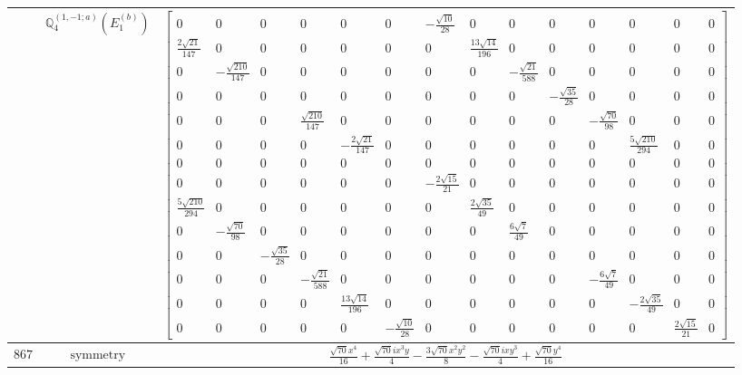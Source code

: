 \documentclass[fleqn,8pt,landscape]{jsarticle}
\begin{document}
\begin{longtable}{ccc}
$  $ & $ \mathbb{Q}_{4}^{(1,-1;a)}(E_{1}^{(b)}) $ & $ \begin{bmatrix} 0 & 0 & 0 & 0 & 0 & 0 & - \frac{\sqrt{10}}{28} & 0 & 0 & 0 & 0 & 0 & 0 & 0 \\ \frac{2 \sqrt{21}}{147} & 0 & 0 & 0 & 0 & 0 & 0 & \frac{13 \sqrt{14}}{196} & 0 & 0 & 0 & 0 & 0 & 0 \\ 0 & - \frac{\sqrt{210}}{147} & 0 & 0 & 0 & 0 & 0 & 0 & - \frac{\sqrt{21}}{588} & 0 & 0 & 0 & 0 & 0 \\ 0 & 0 & 0 & 0 & 0 & 0 & 0 & 0 & 0 & - \frac{\sqrt{35}}{28} & 0 & 0 & 0 & 0 \\ 0 & 0 & 0 & \frac{\sqrt{210}}{147} & 0 & 0 & 0 & 0 & 0 & 0 & - \frac{\sqrt{70}}{98} & 0 & 0 & 0 \\ 0 & 0 & 0 & 0 & - \frac{2 \sqrt{21}}{147} & 0 & 0 & 0 & 0 & 0 & 0 & \frac{5 \sqrt{210}}{294} & 0 & 0 \\ 0 & 0 & 0 & 0 & 0 & 0 & 0 & 0 & 0 & 0 & 0 & 0 & 0 & 0 \\ 0 & 0 & 0 & 0 & 0 & 0 & - \frac{2 \sqrt{15}}{21} & 0 & 0 & 0 & 0 & 0 & 0 & 0 \\ \frac{5 \sqrt{210}}{294} & 0 & 0 & 0 & 0 & 0 & 0 & \frac{2 \sqrt{35}}{49} & 0 & 0 & 0 & 0 & 0 & 0 \\ 0 & - \frac{\sqrt{70}}{98} & 0 & 0 & 0 & 0 & 0 & 0 & \frac{6 \sqrt{7}}{49} & 0 & 0 & 0 & 0 & 0 \\ 0 & 0 & - \frac{\sqrt{35}}{28} & 0 & 0 & 0 & 0 & 0 & 0 & 0 & 0 & 0 & 0 & 0 \\ 0 & 0 & 0 & - \frac{\sqrt{21}}{588} & 0 & 0 & 0 & 0 & 0 & 0 & - \frac{6 \sqrt{7}}{49} & 0 & 0 & 0 \\ 0 & 0 & 0 & 0 & \frac{13 \sqrt{14}}{196} & 0 & 0 & 0 & 0 & 0 & 0 & - \frac{2 \sqrt{35}}{49} & 0 & 0 \\ 0 & 0 & 0 & 0 & 0 & - \frac{\sqrt{10}}{28} & 0 & 0 & 0 & 0 & 0 & 0 & \frac{2 \sqrt{15}}{21} & 0 \end{bmatrix} $ \\ \hline
$ 867 $ & $ \text{symmetry} $ & $ \frac{\sqrt{70} x^{4}}{16} + \frac{\sqrt{70} i x^{3} y}{4} - \frac{3 \sqrt{70} x^{2} y^{2}}{8} - \frac{\sqrt{70} i x y^{3}}{4} + \frac{\sqrt{70} y^{4}}{16} $ \\

\end{longtable}
\end{document}
